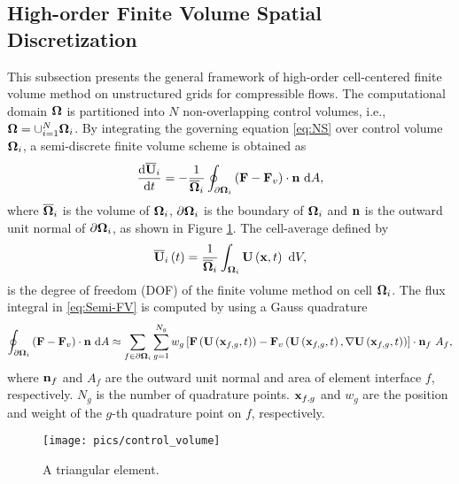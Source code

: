 \subsection{High-order Finite Volume Spatial Discretization}
\label{ssec:FV}

This subsection presents the general framework of high-order cell-centered finite volume method on unstructured grids for compressible flows.
The computational domain $\mathbf{\Omega}$ is partitioned into $N$ non-overlapping control volumes, i.e., $\mathbf{\Omega}= \cup^N_{i=1}{\mathbf{\Omega}_i}$. By integrating the governing equation \eqref{eq:NS} over control volume $\mathbf{\Omega}_i$, a semi-discrete finite volume scheme is obtained as
\begin{equation}
    \label{eq:Semi-FV}
    \dfrac{ \dd\overline{\mathbf{U}}_i }{\dd t} = -\dfrac{1}{\overline{\mathbf{\Omega}}_i} \oint_{\partial \mathbf{\Omega}_i} \left(\mathbf{F} - \mathbf{F}_v \right) \cdot \mathbf{n} \ \dd A,
\end{equation}
where $\overline{\mathbf{\Omega}}_i$ is the volume of $\mathbf{\Omega}_i$, $\partial \mathbf{\Omega}_i$ is the boundary of $\mathbf{\Omega}_i$ and $\mathbf{n}$ is the outward unit normal of $\partial \mathbf{\Omega}_i$, as shown in Figure \ref{fig:controlvolume}. The cell-average defined by
\begin{equation}
    \label{eq:FVMean}
    \overline{\mathbf{U}}_i \left(t\right)= \frac{1}{\overline{\mathbf{\Omega}}_i}\int_{\mathbf{\Omega}_i}\mathbf{U} \left(\mathbf{x},t\right)\ \dd V,
\end{equation}
is the degree of freedom (DOF) of the finite volume method on cell $\mathbf{\Omega}_i$.
The flux integral in \eqref{eq:Semi-FV} is computed by using a Gauss quadrature
\begin{equation}
    \label{eq:Flux-Integral}
    \oint_{\partial \mathbf{\Omega}_i} \left(\mathbf{F} - \mathbf{F}_v \right) \cdot \mathbf{n} \ \dd A \approx \sum_{f \in \partial \mathbf{\Omega}_i} \sum_{g=1}^{N_g} w_g \left[\mathbf{F} \left(\mathbf{U} \left(\mathbf{x}_{f,g},t\right)\right) - \mathbf{F}_v \left(\mathbf{U}\left(\mathbf{x}_{f,g},t\right), \nabla \mathbf{U} \left(\mathbf{x}_{f,g},t\right)\right)\right] \cdot \mathbf{n}_f \ A_f,
\end{equation}
where $\mathbf{n}_f$ and $A_f$ are the outward unit normal and area of element interface $f$, respectively. $N_g$ is the number of quadrature points. $\mathbf{x}_{f,g}$ and $w_g$ are the position and weight of the $g$-th quadrature point on $f$, respectively.

\begin{figure}[htbp!]
    \centering
    \texttt{[image: pics/control\_volume]}
    \caption{A triangular element.}
    \label{fig:controlvolume}
\end{figure}


